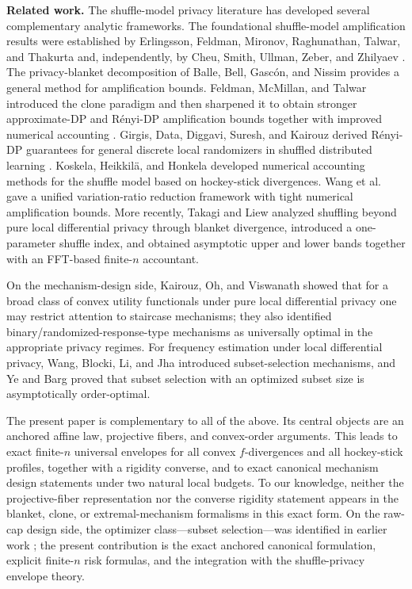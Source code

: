 \documentclass[11pt]{amsart}
\theoremstyle{definition}
\begin{document}
\medskip
\noindent\textbf{Related work.}
The shuffle-model privacy literature has developed several complementary analytic frameworks. The foundational shuffle-model amplification results were established by Erlingsson, Feldman, Mironov, Raghunathan, Talwar, and Thakurta \cite{erlingsson-shuffle} and, independently, by Cheu, Smith, Ullman, Zeber, and Zhilyaev \cite{cheu-shuffle}. The privacy-blanket decomposition of Balle, Bell, Gasc\'on, and Nissim \cite{balle-blanket} provides a general method for amplification bounds. Feldman, McMillan, and Talwar introduced the clone paradigm and then sharpened it to obtain stronger approximate-DP and R\'enyi-DP amplification bounds together with improved numerical accounting \cite{feldman-clones,feldman-stronger}. Girgis, Data, Diggavi, Suresh, and Kairouz derived R\'enyi-DP guarantees for general discrete local randomizers in shuffled distributed learning \cite{girgis-rdp}. Koskela, Heikkil\"a, and Honkela \cite{koskela-shuffle} developed numerical accounting methods for the shuffle model based on hockey-stick divergences. Wang et al.\ \cite{wang-unified} gave a unified variation-ratio reduction framework with tight numerical amplification bounds. More recently, Takagi and Liew \cite{takagi-liew} analyzed shuffling beyond pure local differential privacy through blanket divergence, introduced a one-parameter shuffle index, and obtained asymptotic upper and lower bands together with an FFT-based finite-$n$ accountant.

On the mechanism-design side, Kairouz, Oh, and Viswanath \cite{kov} showed that for a broad class of convex utility functionals under pure local differential privacy one may restrict attention to staircase mechanisms; they also identified binary/randomized-response-type mechanisms as universally optimal in the appropriate privacy regimes. For frequency estimation under local differential privacy, Wang, Blocki, Li, and Jha \cite{wang-ldp} introduced subset-selection mechanisms, and Ye and Barg \cite{ye-barg} proved that subset selection with an optimized subset size is asymptotically order-optimal.

The present paper is complementary to all of the above. Its central objects are an anchored affine law, projective fibers, and convex-order arguments. This leads to exact finite-$n$ universal envelopes for all convex $f$-divergences and all hockey-stick profiles, together with a rigidity converse, and to exact canonical mechanism design statements under two natural local budgets. To our knowledge, neither the projective-fiber representation nor the converse rigidity statement appears in the blanket, clone, or extremal-mechanism formalisms in this exact form. On the raw-cap design side, the optimizer class---subset selection---was identified in earlier work \cite{wang-ldp,ye-barg}; the present contribution is the exact anchored canonical formulation, explicit finite-$n$ risk formulas, and the integration with the shuffle-privacy envelope theory.
\end{document}
